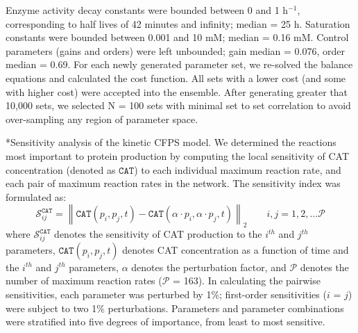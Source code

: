 \documentclass[12pt]{article}
\makeatletter
\renewcommand\subsection{\@startsection
	{subsection}{2}{0mm}
	{-0.05in}
	{-0.5\baselineskip}
	{\normalfont\normalsize\bfseries}}
\newcommand{\norm}[1]{\left\lVert#1\right\rVert}
\makeatother
\begin{document}
Enzyme activity decay constants were bounded between 0 and 1 h$^{-1}$, corresponding to half lives of 42 minutes and infinity; median = 25 h.
Saturation constants were bounded between 0.001 and 10 mM; median = 0.16 mM.
Control parameters (gains and orders) were left unbounded; gain median = 0.076, order median = 0.69.
For each newly generated parameter set, we re-solved the balance equations and calculated the cost function.
All sets with a lower cost (and some with higher cost) were accepted into the ensemble.
After generating greater that 10,000 sets, we selected N = 100 sets with minimal set to set correlation to avoid over-sampling any region of parameter space.

\subsection*{Sensitivity analysis of the kinetic CFPS model.}
We determined the reactions most important to protein production by computing the local sensitivity of CAT concentration (denoted as $\texttt{CAT}$) to each individual maximum reaction rate, and each pair of maximum reaction rates in the network.
The sensitivity index was formulated as:
\begin{equation}\label{eqn:CAT-sensitivity}
    \mathcal{S}_{ij}^{\texttt{CAT}} = \norm{\texttt{CAT}(p_i,p_j,t)-\texttt{CAT}(\alpha \cdot p_i,\alpha \cdot p_j,t)}_{2}\qquad{i,j=1,2,\hdots\mathcal{P}}
\end{equation}
where $\mathcal{S}_{ij}^{\texttt{CAT}}$ denotes the sensitivity of CAT production to the $i^{th}$ and $j^{th}$ parameters,
$\texttt{CAT}(p_i,p_j,t)$ denotes CAT concentration as a function of time and the $i^{th}$ and $j^{th}$ parameters,
$\alpha$ denotes the perturbation factor, and $\mathcal{P}$ denotes the number of maximum reaction rates ($\mathcal{P}$ = 163).
In calculating the pairwise sensitivities, each parameter was perturbed by 1\%; first-order sensitivities ($i$ = $j$) were subject to two 1\% perturbations.
Parameters and parameter combinations were stratified into five degrees of importance, from least to most sensitive.
\end{document}
